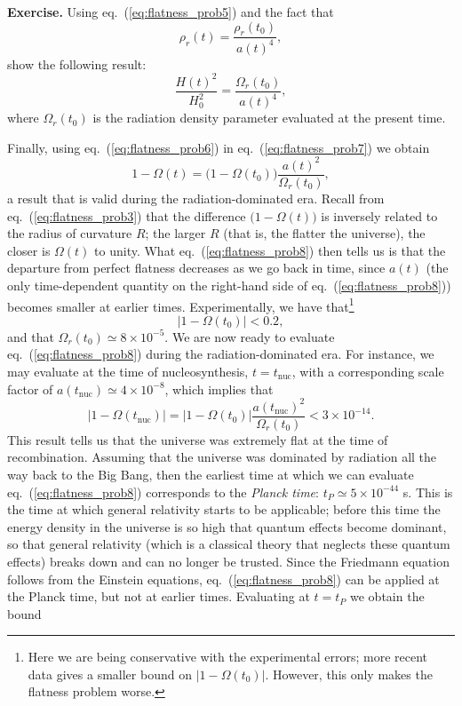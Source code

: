 {\bf Exercise.} Using eq.\ (\ref{eq:flatness_prob5}) and the fact that
\begin{equation}
\rho_r(t)=\frac{\rho_r(t_0)}{a(t)^4},
\end{equation}
show the following result:
\begin{equation} \label{eq:flatness_prob6}
\frac{H(t)^2}{H_0^2}=\frac{\Omega_r(t_0)}{a(t)^4},
\end{equation}
where $\Omega_r(t_0)$ is the radiation density parameter evaluated at the present time.

\par\vspace{\baselineskip}

Finally, using eq.\ (\ref{eq:flatness_prob6}) in eq.\ (\ref{eq:flatness_prob7}) we obtain
\begin{equation} \label{eq:flatness_prob8}
1-\Omega(t)=\big(1-\Omega(t_0)\big)\frac{a(t)^2}{\Omega_r(t_0)},
\end{equation}
a result that is valid during the radiation-dominated era. Recall from eq.\ (\ref{eq:flatness_prob3}) that the difference $\big(1-\Omega(t)\big)$ is inversely related to the radius of curvature $R$; the larger $R$ (that is, the flatter the universe), the closer is $\Omega(t)$ to unity. What eq.\ (\ref{eq:flatness_prob8}) then tells us is that the departure from perfect flatness decreases as we go back in time, since $a(t)$ (the only time-dependent quantity on the right-hand side of eq.\ (\ref{eq:flatness_prob8})) becomes smaller at earlier times. Experimentally, we have that\footnote{Here we are being conservative with the experimental errors; more recent data gives a smaller bound on $|1-\Omega(t_0)|$. However, this only makes the flatness problem worse.}
\begin{equation}
|1-\Omega(t_0)|<0.2,
\end{equation}
and that $\Omega_r(t_0)\simeq8\times10^{-5}$. We are now ready to evaluate eq.\ (\ref{eq:flatness_prob8}) during the radiation-dominated era. For instance, we may evaluate at the time of nucleosynthesis, $t=t_{\mathrm{nuc}}$, with a corresponding scale factor of $a(t_{\mathrm{nuc}})\simeq 4\times10^{-8}$, which implies that
\begin{equation} \label{eq:flatness_nucleosynthesis}
|1-\Omega(t_{\mathrm{nuc}})|=|1-\Omega(t_0)|\frac{a(t_{\mathrm{nuc}})^2}{\Omega_r(t_0)}<3\times10^{-14}.
\end{equation}
This result tells us that the universe was extremely flat at the time of recombination. Assuming that the universe was dominated by radiation all the way back to the Big Bang, then the earliest time at which we can evaluate eq.\ (\ref{eq:flatness_prob8}) corresponds to the {\it Planck time}: $t_P\simeq5\times10^{-44}$ s. This is the time at which general relativity starts to be applicable; before this time the energy density in the universe is so high that quantum effects become dominant, so that general relativity (which is a classical theory that neglects these quantum effects) breaks down and can no longer be trusted. Since the Friedmann equation follows from the Einstein equations, eq.\ (\ref{eq:flatness_prob8}) can be applied at the Planck time, but not at earlier times. Evaluating at $t=t_P$ we obtain the bound
